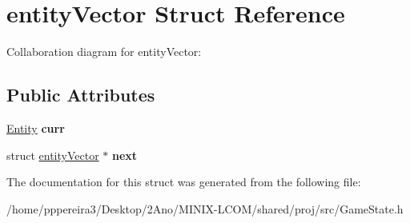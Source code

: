 \hypertarget{structentityVector}{}\section{entity\+Vector Struct Reference}
\label{structentityVector}


Collaboration diagram for entity\+Vector\+:
\subsection*{Public Attributes}
\begin{DoxyCompactItemize}
\item 
\hyperlink{structentity__t}{Entity} {\bfseries curr}
\item 
struct \hyperlink{structentityVector}{entity\+Vector} $\ast$ {\bfseries next}
\end{DoxyCompactItemize}


The documentation for this struct was generated from the following file\+:\begin{DoxyCompactItemize}
\item 
/home/pppereira3/\+Desktop/2\+Ano/\+M\+I\+N\+I\+X-\/\+L\+C\+O\+M/shared/proj/src/Game\+State.\+h\end{DoxyCompactItemize}
